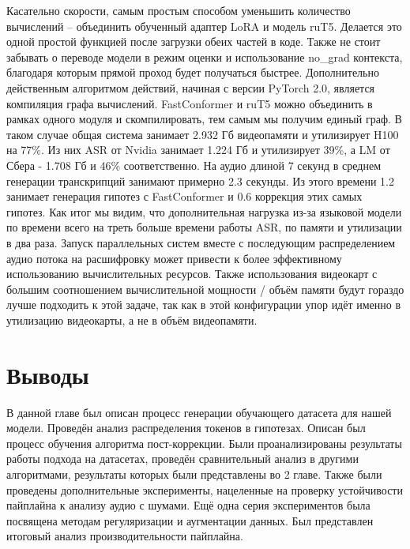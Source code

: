 Касательно скорости, самым простым способом уменьшить количество вычислений -- объединить обученный адаптер LoRA и модель ruT5.
Делается это одной простой функцией после загрузки обеих частей в коде.
Также не стоит забывать о переводе модели в режим оценки и использование no\_grad контекста, благодаря которым прямой проход будет получаться быстрее.
Дополнительно действенным алгоритмом действий, начиная с версии PyTorch 2.0, является компиляция графа вычислений.
FastConformer и ruT5 можно объединить в рамках одного модуля и скомпилировать, тем самым мы получим единый граф.
В таком случае общая система занимает 2.932 Гб видеопамяти и утилизирует H100 на 77\%.
Из них ASR от Nvidia занимает 1.224 Гб и утилизирует 39\%, а LM от Сбера - 1.708 Гб и 46\% соответственно.
На аудио длиной 7 секунд в среднем генерации транскрипций занимают примерно 2.3 секунды.
Из этого времени 1.2 занимает генерация гипотез с FastConformer и 0.6 коррекция этих самых гипотез.
Как итог мы видим, что дополнительная нагрузка из-за языковой модели по времени всего на треть больше времени работы ASR, по памяти и утилизации в два раза.
Запуск параллельных систем вместе с последующим распределением аудио  потока на расшифровку может привести к более эффективному использованию вычислительных ресурсов.
Также использования видеокарт с большим соотношением вычислительной мощности / объём памяти будут гораздо лучше подходить к этой задаче, так как в этой конфигурации упор идёт именно в утилизацию видеокарты, а не в объём видеопамяти.

\section{Выводы}
В данной главе был описан процесс генерации обучающего датасета для нашей модели.
Проведён анализ распределения токенов в гипотезах.
Описан был процесс обучения алгоритма пост-коррекции.
Были проанализированы результаты работы подхода на датасетах, проведён сравнительный анализ в другими алгоритмами, результаты которых были представлены во 2 главе.
Также были проведены дополнительные эксперименты, нацеленные на проверку устойчивости пайплайна к анализу аудио с шумами.
Ещё одна серия экспериментов была посвящена методам регуляризации и аугментации данных.
Был представлен итоговый анализ производительности пайплайна.
